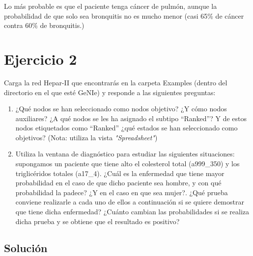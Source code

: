 \documentclass{article}
\begin{document}
Lo más probable es que el paciente tenga cáncer de pulmón, aunque la probabilidad de que solo sea bronquitis no es mucho menor (casi 65\% de cáncer contra 60\% de bronquitis.)

\section{\textbf{Ejercicio 2}}

Carga la red Hepar-II que encontrarás en la carpeta Examples (dentro del directorio en el que esté GeNIe) y responde a las siguientes preguntas:

\begin{enumerate}[label=\alph*)]
\item ¿Qué nodos se han seleccionado como nodos objetivo? ¿Y cómo nodos auxiliares? ¿A qué nodos se les ha asignado el subtipo “Ranked”? Y de estos nodos etiquetados como “Ranked” ¿qué estados se han seleccionado como objetivos? (Nota: utiliza la vista \textit{"Spreadsheet"})
\item Utiliza la ventana de diagnóstico para estudiar las siguientes situaciones: supongamos un paciente que tiene alto el colesterol total (a999\_350) y los triglicéridos totales (a17\_4). ¿Cuál es la enfermedad que tiene mayor probabilidad en el caso de que dicho paciente sea hombre, y con qué probabilidad la padece? ¿Y en el caso en que sea mujer?. ¿Qué prueba conviene realizarle a cada uno de ellos a continuación si se quiere demostrar que tiene dicha enfermedad? ¿Cuánto cambian las probabilidades si se realiza dicha prueba y se obtiene que el resultado es positivo?
\end{enumerate}

\subsection{Solución}
\end{document}
